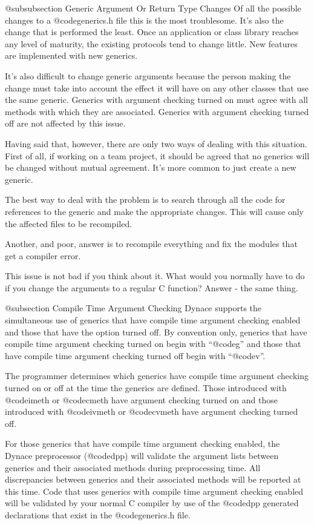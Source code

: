 @subsubsection Generic Argument Or Return Type Changes
Of all the possible changes to a @code{generics.h} file this is the
most troublesome.  It's also the change that is performed
the least.  Once an application or class library reaches any level
of maturity, the existing protocols tend to change little.  New
features are implemented with new generics.

It's also difficult to change generic arguments because
the person making the change must take into account the effect it will
have on any other classes that use the same generic.  Generics with
argument checking turned on must agree with all methods with which they are
associated.  Generics with argument checking turned off are not
affected by this issue.

Having said that, however, there are only two ways of dealing with
this situation.  First of all, if working on a team project, it should
be agreed that no generics will be changed without mutual agreement.
It's more common to just create a new generic.

The best way to deal with the problem is to search through all the
code for references to the generic and make the appropriate changes.
This will cause only the affected files to be recompiled.

Another, and poor, answer is to recompile everything and fix the modules
that get a compiler error.

This issue is not bad if you think about it.  What would you normally
have to do if you change the arguments to a regular C function?  Answer -
the same thing.

@subsection Compile Time Argument Checking
Dynace supports the simultaneous use of generics that have compile
time argument checking enabled and those that have the option
turned off.  By convention only, generics that have compile time
argument checking turned on begin with ``@code{g}'' and those that
have compile time argument checking turned off begin with ``@code{v}''. 

The programmer determines which generics have compile time argument checking
turned on or off at the time the generics are defined.  Those introduced
with @code{imeth} or @code{cmeth} have argument checking turned on and
those introduced with @code{ivmeth} or @code{cvmeth} have argument checking
turned off.

For those generics that have compile time argument checking enabled,
the Dynace preprocessor (@code{dpp}) will validate the argument lists
between generics and their associated methods during preprocessing time.
All discrepancies between generics and their associated methods will be
reported at this time.  Code that uses generics with compile time
argument checking enabled will be validated by your normal C compiler by
use of the @code{dpp} generated declarations that exist in the
@code{generics.h} file.

